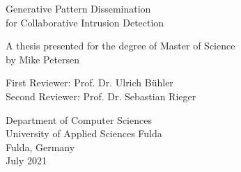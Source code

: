 

\newcommand\BackgroundPic{%
\put(0,-170){%
\parbox[b][\paperheight]{\paperwidth}{%
\vfill
\centering
{\transparent{0.05} }%
\vfill
}}}


\begin{titlepage}
    \begin{center}
        \vspace*{1cm}
            
        \Huge
        Generative Pattern Dissemination \\
        for Collaborative Intrusion Detection
            
        \vspace{0.5cm}
        \large
            
        \vspace{3cm}
            
            
        \normalsize
        A thesis presented for the degree of Master of Science \\
        by Mike Petersen
        
        \vspace{1.5cm}
        
        First Reviewer: Prof. Dr. Ulrich Bühler \\
        Second Reviewer: Prof. Dr. Sebastian Rieger
            
        \vfill
            
        \normalsize
        Department of Computer Sciences\\
        University of Applied Sciences Fulda\\
        Fulda, Germany\\
        July 2021
            
    \end{center}
\end{titlepage}
